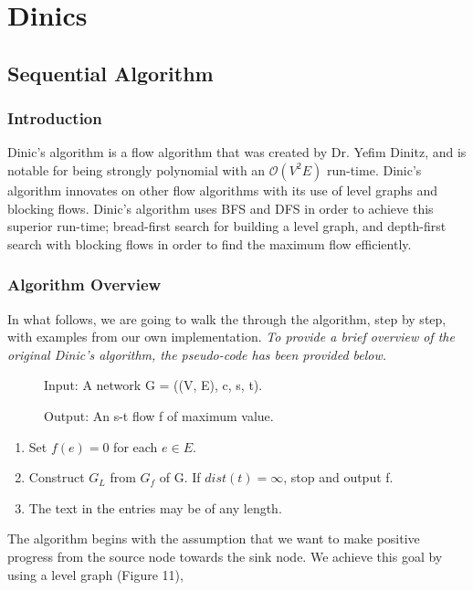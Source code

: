 \section{Dinics}

\subsection{Sequential Algorithm}
    \subsubsection{Introduction}
    Dinic's algorithm is a flow algorithm that was created by Dr. Yefim Dinitz, and is notable for being strongly polynomial with an $\mathcal{O}(V^2E)$ run-time. Dinic's algorithm innovates on other flow algorithms with its use of level graphs and blocking flows. Dinic's algorithm uses BFS and DFS in order to achieve this superior run-time; bread-first search for building a level graph, and depth-first search with blocking flows in order to find the maximum flow efficiently.

    \subsubsection{Algorithm Overview}
       In what follows, we are going to walk the through the algorithm, step by step, with examples from our own implementation. \emph{To provide a brief overview of the original Dinic's algorithm, the pseudo-code has been provided below.}
       
    \begin{description}
        \item[] Input: A network G = ((V, E), c, s, t).
        \item[] Output: An s-t flow f of maximum value.  
    \end{description}    
    \begin{enumerate}
        \item Set $f(e) = 0$ for each $e \in E.$
        \item Construct $G_L$ from $G_f$ of G. If $dist(t)=\infty$, stop and output f.
        \item The text in the entries may be of any length.
    \end{enumerate}
    
    The algorithm begins with the assumption that we want to make positive progress from the source node towards the sink node. We achieve this goal by using a level graph (Figure 11),
    
